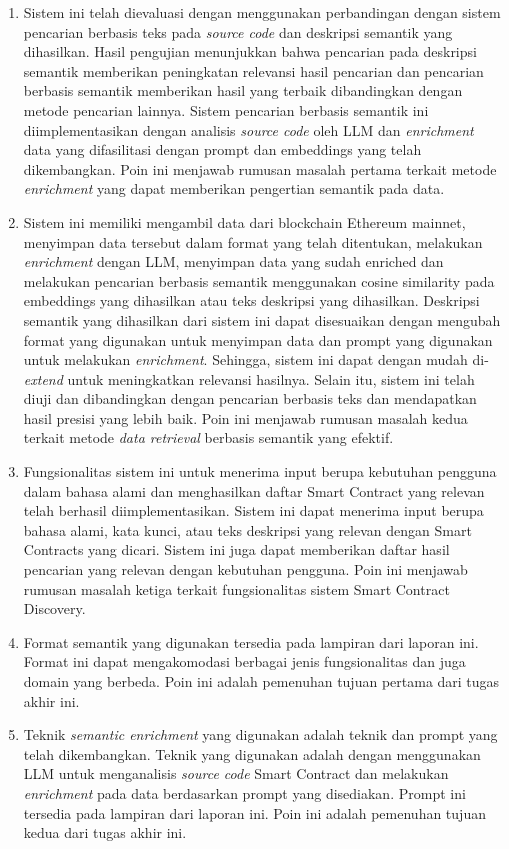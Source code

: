 \begin{enumerate}
    \item Sistem ini telah dievaluasi dengan menggunakan perbandingan dengan sistem pencarian berbasis teks pada \textit{source code} dan deskripsi semantik yang dihasilkan. Hasil pengujian menunjukkan bahwa pencarian pada deskripsi semantik memberikan peningkatan relevansi hasil pencarian dan pencarian berbasis semantik memberikan hasil yang terbaik dibandingkan dengan metode pencarian lainnya. Sistem pencarian berbasis semantik ini diimplementasikan dengan analisis \textit{source code} oleh LLM dan \textit{enrichment} data yang difasilitasi dengan prompt dan embeddings yang telah dikembangkan. Poin ini menjawab rumusan masalah pertama terkait metode \textit{enrichment} yang dapat memberikan pengertian semantik pada data.
    \item Sistem ini memiliki mengambil data dari blockchain Ethereum mainnet, menyimpan data tersebut dalam format yang telah ditentukan, melakukan \textit{enrichment} dengan LLM, menyimpan data yang sudah enriched dan melakukan pencarian berbasis semantik menggunakan cosine similarity pada embeddings yang dihasilkan atau teks deskripsi yang dihasilkan. Deskripsi semantik yang dihasilkan dari sistem ini dapat disesuaikan dengan mengubah format yang digunakan untuk menyimpan data dan prompt yang digunakan untuk melakukan \textit{enrichment}. Sehingga, sistem ini dapat dengan mudah di-\textit{extend} untuk meningkatkan relevansi hasilnya. Selain itu, sistem ini telah diuji dan dibandingkan dengan pencarian berbasis teks dan mendapatkan hasil presisi yang lebih baik. Poin ini menjawab rumusan masalah kedua terkait metode \textit{data retrieval} berbasis semantik yang efektif. 
    \item Fungsionalitas sistem ini untuk menerima input berupa kebutuhan pengguna dalam bahasa alami dan menghasilkan daftar Smart Contract yang relevan telah berhasil diimplementasikan. Sistem ini dapat menerima input berupa bahasa alami, kata kunci, atau teks deskripsi yang relevan dengan Smart Contracts yang dicari. Sistem ini juga dapat memberikan daftar hasil pencarian yang relevan dengan kebutuhan pengguna. Poin ini menjawab rumusan masalah ketiga terkait fungsionalitas sistem Smart Contract Discovery.
    \item Format semantik yang digunakan tersedia pada lampiran dari laporan ini. Format ini dapat mengakomodasi berbagai jenis fungsionalitas dan juga domain yang berbeda. Poin ini adalah pemenuhan tujuan pertama dari tugas akhir ini.
    \item Teknik \textit{semantic enrichment} yang digunakan adalah teknik dan prompt yang telah dikembangkan. Teknik yang digunakan adalah dengan menggunakan LLM untuk menganalisis \textit{source code} Smart Contract dan melakukan \textit{enrichment} pada data berdasarkan prompt yang disediakan. Prompt ini tersedia pada lampiran dari laporan ini. Poin ini adalah pemenuhan tujuan kedua dari tugas akhir ini.

\end{enumerate}
